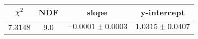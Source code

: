 \begin{tabular}{|c|c|c|c|}

\hline
$\chi^{2}$ & NDF & slope & y-intercept  \\
\hline
7.3148 & 9.0 & $-0.0001\pm0.0003$ & $1.0315\pm0.0407$ \\
\hline

\end{tabular}